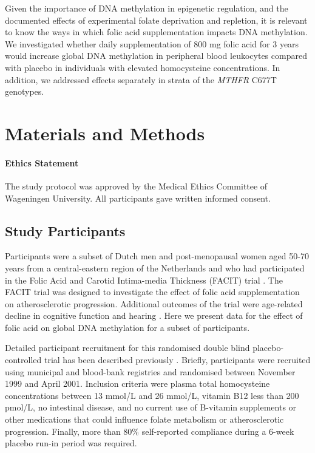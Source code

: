 \noindent Given the importance of DNA methylation in epigenetic regulation, and the documented effects of experimental folate deprivation and repletion, it is relevant to know the ways in which folic acid supplementation impacts DNA methylation. We investigated whether daily supplementation of 800 mg folic acid for 3 years would increase global DNA methylation in peripheral blood leukocytes compared with placebo in individuals with elevated homocysteine concentrations. In addition, we addressed effects separately in strata of the \emph{MTHFR} C677T genotypes.

\section{Materials and Methods} %

\paragraph*{Ethics Statement} 
The study protocol was approved by the Medical Ethics Committee of Wageningen University. All participants gave written informed consent.

\subsection{Study Participants} %
\noindent Participants were a subset of Dutch men and post-menopausal women aged 50-70 years from a central-eastern region of the Netherlands and who had participated in the Folic Acid and Carotid Intima-media Thickness (FACIT) trial \cite{c416}. The FACIT trial was designed to investigate the effect of folic acid supplementation on atherosclerotic progression. Additional outcomes of the trial were age-related decline in cognitive function and hearing \cite{c417,c419}. Here we present data for the effect of folic acid on global DNA methylation for a subset of participants.

\noindent Detailed participant recruitment for this randomised double blind placebo-controlled trial has been described previously \cite{c417}. Briefly, participants were recruited using municipal and blood-bank registries and randomised between November 1999 and April 2001. Inclusion criteria were plasma total homocysteine concentrations between 13 mmol/L and 26 mmol/L, vitamin B12 less than 200 pmol/L, no intestinal disease, and no current use of B-vitamin supplements or other medications that could influence folate metabolism or atherosclerotic progression. Finally, more than 80\% self-reported compliance during a 6-week placebo run-in period was required.

